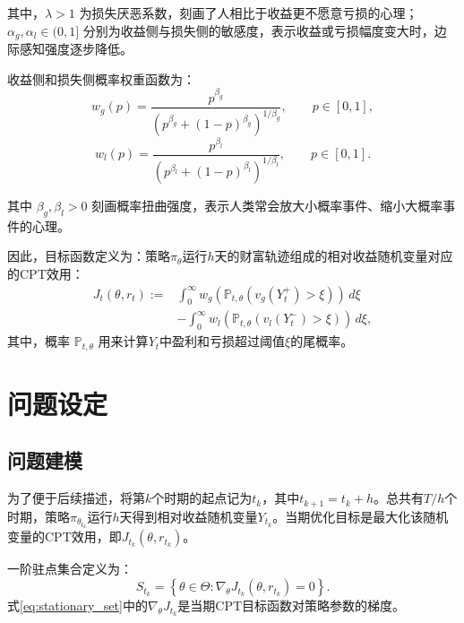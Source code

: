\documentclass{sufethesismas}
\begin{document}
其中，$\lambda>1$ 为损失厌恶系数，刻画了人相比于收益更不愿意亏损的心理；$\alpha_g,\alpha_l\in(0,1]$ 分别为收益侧与损失侧的敏感度，表示收益或亏损幅度变大时，边际感知强度逐步降低。

收益侧和损失侧概率权重函数为：
\begin{equation}
 w_g(p)=\frac{p^{\beta_g}}{\left(p^{\beta_g}+(1-p)^{\beta_g}\right)^{1/\beta_g}},\qquad p\in[0,1],
\end{equation}
\begin{equation}
 w_l(p)=\frac{p^{\beta_l}}{\left(p^{\beta_l}+(1-p)^{\beta_l}\right)^{1/\beta_l}},\qquad p\in[0,1].
\end{equation}

其中 $\beta_g,\beta_l>0$ 刻画概率扭曲强度，表示人类常会放大小概率事件、缩小大概率事件的心理。

因此，目标函数定义为：策略$\pi_{\theta}$运行$h$天的财富轨迹组成的相对收益随机变量对应的CPT效用：
\begin{equation}
\label{eq:cpt_objective}
\begin{aligned}
J_t(\theta,r_t)
:=&\int_0^\infty w_g\!\left(\mathbb{P}_{t,\theta}\left(v_g(Y_t^+)>\xi\right)\right)\,d\xi \\
&-\int_0^\infty  w_l\!\left(\mathbb{P}_{t,\theta}\left(v_l(Y_t^-)>\xi\right)\right)\,d\xi,
\end{aligned}
\end{equation}
其中，概率 $\mathbb{P}_{t,\theta}$ 用来计算$Y_t$中盈利和亏损超过阈值$\xi$的尾概率。
\section{问题设定}
\subsection{问题建模}
为了便于后续描述，将第$k$个时期的起点记为$t_k$，其中$t_{k+1}=t_k+h$。总共有$T/h$个时期，策略$\pi_{\theta_{t_k}}$运行$h$天得到相对收益随机变量$Y_{t_k}$。当期优化目标是最大化该随机变量的CPT效用，即$J_{t_k}(\theta,r_{t_k})$。

一阶驻点集合定义为：
\begin{equation}
\label{eq:stationary_set}
S_{t_k}
=
\left\{
\theta\in\Theta:
\nabla_\theta J_{t_k}(\theta,r_{t_k})=0
\right\}.
\end{equation}
式\eqref{eq:stationary_set}中的$\nabla_\theta J_{t_k}$是当期CPT目标函数对策略参数的梯度。
\end{document}
